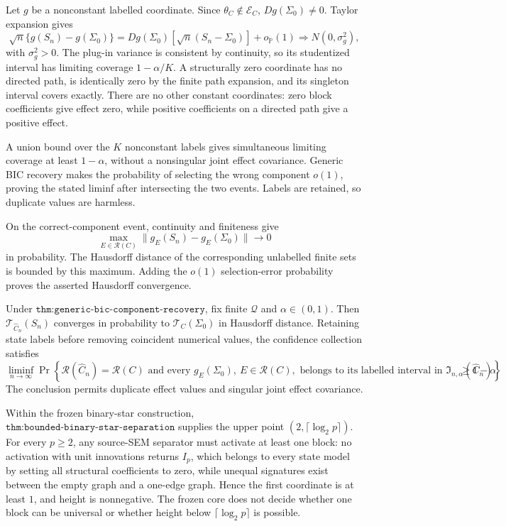 Let \(g\) be a nonconstant labelled coordinate.  Since \(\theta_C\notin\mathcal E_C\), \(Dg(\Sigma_0)\ne0\).  Taylor expansion gives
\[
 \sqrt n\{g(S_n)-g(\Sigma_0)\}
 =Dg(\Sigma_0)[\sqrt n(S_n-\Sigma_0)]+o_{\mathbb P}(1)
 \Longrightarrow N(0,\sigma_g^2),
\]
with \(\sigma_g^2>0\).  The plug-in variance is consistent by continuity, so its studentized interval has limiting coverage \(1-\alpha/K\).  A structurally zero coordinate has no directed path, is identically zero by the finite path expansion, and its singleton interval covers exactly.  There are no other constant coordinates: zero block coefficients give effect zero, while positive coefficients on a directed path give a positive effect.

A union bound over the \(K\) nonconstant labels gives simultaneous limiting coverage at least \(1-\alpha\), without a nonsingular joint effect covariance.  Generic BIC recovery makes the probability of selecting the wrong component \(o(1)\), proving the stated liminf after intersecting the two events.  Labels are retained, so duplicate values are harmless.

On the correct-component event, continuity and finiteness give
\[
 \max_{E\in\mathcal R(C)}\|g_E(S_n)-g_E(\Sigma_0)\|\longrightarrow0
\]
in probability.  The Hausdorff distance of the corresponding unlabelled finite sets is bounded by this maximum.  Adding the \(o(1)\) selection-error probability proves the asserted Hausdorff convergence.

Under \(\texttt{thm:generic-bic-component-recovery}\), fix finite \(\mathcal Q\) and \(\alpha\in(0,1)\). Then \(\mathcal T_{\widehat C_n}(S_n)\) converges in probability to \(\mathcal T_C(\Sigma_0)\) in Hausdorff distance. Retaining state labels before removing coincident numerical values, the confidence collection satisfies
\[
\liminf_{n\to\infty}\Pr\left\{\mathcal R(\widehat C_n)=\mathcal R(C)\text{ and every }g_E(\Sigma_0),\ E\in\mathcal R(C),\text{ belongs to its labelled interval in }\mathfrak I_{n,\alpha}(\widehat C_n)\right\}\geq1-\alpha.
\]
The conclusion permits duplicate effect values and singular joint effect covariance.

Within the frozen binary-star construction, \(\texttt{thm:bounded-binary-star-separation}\) supplies the upper point \((2,\lceil\log_2p\rceil)\).  For every \(p\ge2\), any source-SEM separator must activate at least one block: no activation with unit innovations returns \(I_p\), which belongs to every state model by setting all structural coefficients to zero, while unequal signatures exist between the empty graph and a one-edge graph.  Hence the first coordinate is at least \(1\), and height is nonnegative.  The frozen core does not decide whether one block can be universal or whether height below \(\lceil\log_2p\rceil\) is possible.
